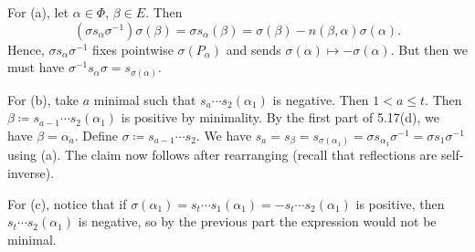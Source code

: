 For (a), let $\alpha \in \Phi$, $\beta \in E$. Then
\[ (\sigma s_\alpha \sigma^{-1})\sigma(\beta) = \sigma s_{\alpha}(\beta) = \sigma(\beta) - n(\beta, \alpha)\sigma(\alpha). \]
Hence, $\sigma s_\alpha \sigma^{-1}$ fixes pointwise $\sigma(P_\alpha)$ and
sends $\sigma(\alpha) \mapsto -\sigma(\alpha)$. But then we must have
$\sigma^{-1} s_\alpha\sigma = s_{\sigma(\alpha)}$.

For (b), take $a$ minimal such that $s_a\cdots s_2(\alpha_1)$ is negative. Then
$1 < a\leq t$. Then $\beta\coloneqq s_{a-1}\cdots s_2(\alpha_1)$ is positive
by minimality. By the first part of 5.17(d), we have $\beta = \alpha_a$.
Define $\sigma\coloneqq s_{a-1}\cdots s_2$. We have
$s_a = s_{\beta} = s_{\sigma(\alpha_1)} = \sigma s_{\alpha_1}\sigma^{-1} = \sigma s_1\sigma^{-1}$ using
(a). The claim now follows after rearranging (recall that reflections
are self-inverse).

For (c), notice that if
$\sigma(\alpha_1) = s_t\cdots s_1(\alpha_1) = -s_t\cdots s_2(\alpha_1)$ is positive,
then $s_t\cdots s_2(\alpha_1)$ is negative, so by the previous part the
expression would not be minimal.
